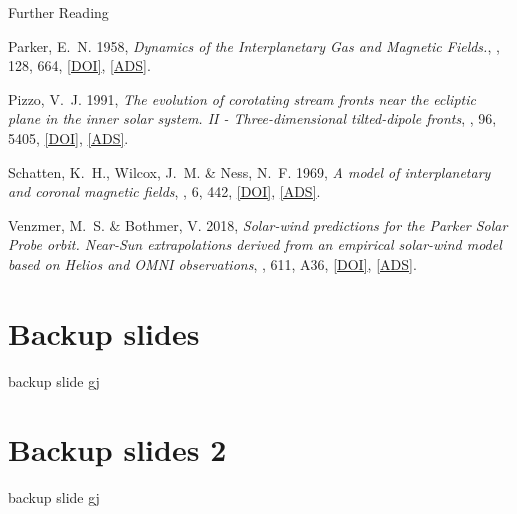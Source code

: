\documentclass[11pt,aspectratio=1610]{beamer}	%
\begin{document}
\begin{frame}[allowframebreaks]{Further Reading}
\begin{thebibliography}{10}
			{Parker}, E.~N. 1958, \emph{{Dynamics of the Interplanetary Gas and Magnetic Fields.}}, \apj, 128, 664, \href{http://dx.doi.org/10.1086/146579}{[DOI]}, \href{http://adsabs.harvard.edu/abs/1958ApJ...128..664P}{[ADS]}.

			{Pizzo}, V.~J. 1991, \emph{{The evolution of corotating stream fronts near the
			ecliptic plane in the inner solar system. II - Three-dimensional
			tilted-dipole fronts}}, \jgr, 96, 5405,
			\href{http://dx.doi.org/10.1029/91JA00155}{[DOI]},
			\href{http://adsabs.harvard.edu/abs/1991JGR....96.5405P}{[ADS]}.
			
			{Schatten}, K.~H., {Wilcox}, J.~M. \& {Ness}, N.~F. 1969, \emph{{A model of
			interplanetary and coronal magnetic fields}}, \solphys, 6, 442,
			\href{http://dx.doi.org/10.1007/BF00146478}{[DOI]},
			\href{http://adsabs.harvard.edu/abs/1969SoPh....6..442S}{[ADS]}.

			{Venzmer}, M.~S. \& {Bothmer}, V. 2018, \emph{{Solar-wind predictions for the
			Parker Solar Probe orbit. Near-Sun extrapolations derived from an empirical
			solar-wind model based on Helios and OMNI observations}}, \aap, 611, A36,
			\href{http://dx.doi.org/10.1051/0004-6361/201731831}{[DOI]},
			\href{http://adsabs.harvard.edu/abs/2018A\%26A...611A..36V}{[ADS]}.

	\end{thebibliography}
\end{frame}

\appendix

\section{Backup slides}

\begin{frame}{backup slide}{}
	gj
\end{frame}

\section{Backup slides 2}

\begin{frame}{backup slide}{}
	gj
\end{frame}

% 
\end{document}
